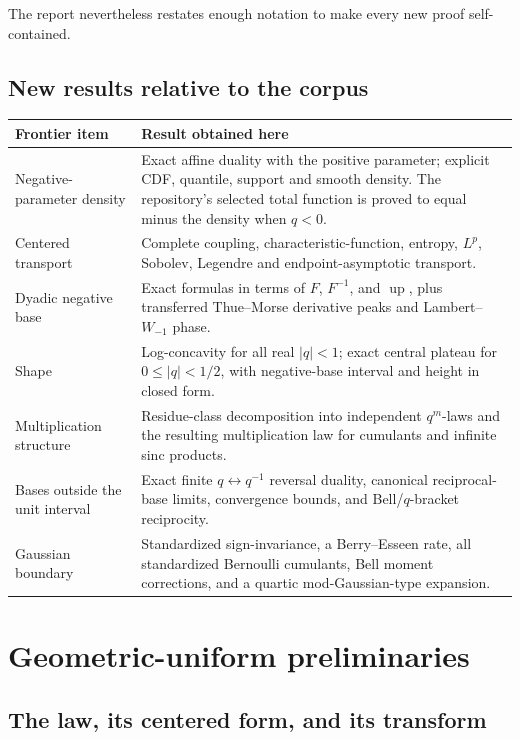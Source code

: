\documentclass[11pt]{article}
\theoremstyle{definition}
\newcommand{\Up}{\operatorname{up}}
\begin{document}
The report nevertheless restates enough notation to make every new proof self-contained.

\subsection{New results relative to the corpus}

\begin{longtable}{@{}p{}p{}@{}}
\toprule
Frontier item & Result obtained here \\
\midrule
\endhead
Negative-parameter density & Exact affine duality with the positive parameter; explicit
CDF, quantile, support and smooth density.  The repository's selected total function is
proved to equal minus the density when \(q<0\). \\
Centered transport & Complete coupling, characteristic-function, entropy, \(L^p\),
Sobolev, Legendre and endpoint-asymptotic transport. \\
Dyadic negative base & Exact formulas in terms of \(F\), \(F^{-1}\), and \(\Up\), plus
transferred Thue--Morse derivative peaks and Lambert--\(W_{-1}\) phase. \\
Shape & Log-concavity for all real \(\lvert q\rvert<1\); exact central plateau for
\(0\le \lvert q\rvert<1/2\), with negative-base interval and height in closed form. \\
Multiplication structure & Residue-class decomposition into independent
\(q^m\)-laws and the resulting multiplication law for cumulants and infinite sinc
products. \\
Bases outside the unit interval & Exact finite \(q\leftrightarrow q^{-1}\) reversal
duality, canonical reciprocal-base limits, convergence bounds, and Bell/$q$-bracket
reciprocity. \\
Gaussian boundary & Standardized sign-invariance, a Berry--Esseen rate, all
standardized Bernoulli cumulants, Bell moment corrections, and a quartic
mod-Gaussian-type expansion. \\
\bottomrule
\end{longtable}

\section{Geometric-uniform preliminaries}

\subsection{The law, its centered form, and its transform}
\end{document}
